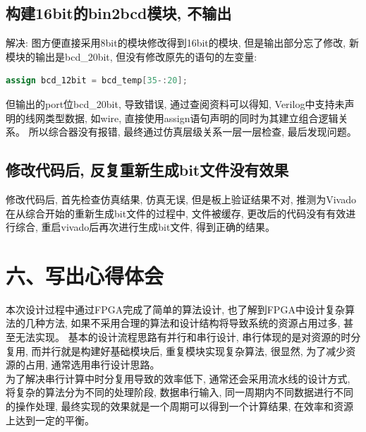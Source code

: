 \documentclass{article}
\newcommand{\fourhao}{\fontsize{14pt}{\baselineskip}\selectfont} %
\newcommand{\xiaosihao}{\fontsize{12pt}{\baselineskip}\selectfont} %
\begin{document}
\subsection*{构建16bit的bin2bcd模块, 不输出}
解决: 图方便直接采用8bit的模块修改得到16bit的模块, 但是输出部分忘了修改, 新模块的输出是bcd\_20bit, 但没有修改原先的语句的左变量:
\begin{lstlisting}[language=Verilog]
assign bcd_12bit = bcd_temp[35-:20];
\end{lstlisting}
但输出的port位bcd\_20bit, 导致错误, 通过查阅资料可以得知, Verilog中支持未声明的线网类型数据, 如wire, 直接使用assign语句声明的同时为其建立组合逻辑关系。
所以综合器没有报错, 最终通过仿真层级关系一层一层检查, 最后发现问题。
\subsection*{修改代码后, 反复重新生成bit文件没有效果}
修改代码后, 首先检查仿真结果, 仿真无误, 但是板上验证结果不对, 推测为Vivado在从综合开始的重新生成bit文件的过程中, 文件被缓存, 更改后的代码没有有效进行综合, 重启vivado后再次进行生成bit文件, 得到正确的结果。
\section*{\fourhao 六、写出心得体会}
\xiaosihao
{}
本次设计过程中通过FPGA完成了简单的算法设计, 也了解到FPGA中设计复杂算法的几种方法, 如果不采用合理的算法和设计结构将导致系统的资源占用过多, 甚至无法实现。
基本的设计流程思路有并行和串行设计, 串行体现的是对资源的时分复用, 而并行就是构建好基础模块后, 重复模块实现复杂算法, 很显然, 为了减少资源的占用, 通常选用串行设计思路。\\
为了解决串行计算中时分复用导致的效率低下, 通常还会采用流水线的设计方式, 将复杂的算法分为不同的处理阶段, 数据串行输入, 同一周期内不同数据进行不同的操作处理, 最终实现的效果就是一个周期可以得到一个计算结果, 在效率和资源上达到一定的平衡。\\
\end{document}
